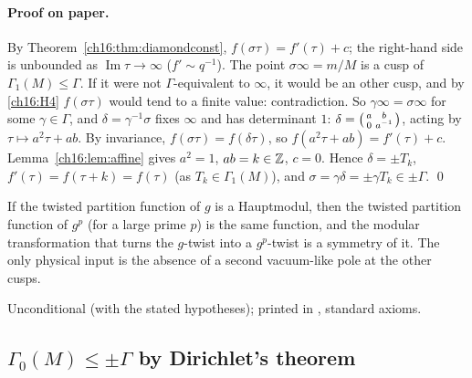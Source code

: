 \paragraph{Proof on paper.}  By Theorem~\ref{ch16:thm:diamondconst}, $f(\sigma\tau)=f'(\tau)+c$; the right-hand side is
unbounded as $\operatorname{Im}\tau\to\infty$ ($f'\sim q^{-1}$).  The point $\sigma\infty=m/M$ is a cusp of
$\Gamma_1(M)\le\Gamma$.  If it were not $\Gamma$-equivalent to $\infty$, it would be an other cusp, and by \ref{ch16:H4}
$f(\sigma\tau)$ would tend to a finite value: contradiction.  So $\gamma\infty=\sigma\infty$ for some $\gamma\in\Gamma$,
and $\delta=\gamma^{-1}\sigma$ fixes $\infty$ and has determinant $1$: $\delta=\left(\begin{smallmatrix}a&b\\0&a^{-1}\end{smallmatrix}\right)$, acting by
$\tau\mapsto a^2\tau+ab$.  By invariance, $f(\sigma\tau)=f(\delta\tau)$, so $f(a^2\tau+ab)=f'(\tau)+c$.
Lemma~\ref{ch16:lem:affine} gives $a^2=1$, $ab=k\in{\mathbb{Z}}$, $c=0$.  Hence $\delta=\pm T_k$, $f'(\tau)=f(\tau+k)=f(\tau)$ (as
$T_k\in\Gamma_1(M)$), and $\sigma=\gamma\delta=\pm\gamma T_k\in\pm\Gamma$. \qed
\begin{physics}
If the twisted partition function of $g$ is a Hauptmodul, then the twisted partition function of $g^p$ (for a large
prime $p$) is the same function, and the modular transformation that turns the $g$-twist into a $g^p$-twist is a
symmetry of it.  The only physical input is the absence of a second vacuum-like pole at the other cusps.
\end{physics}
\begin{status}
Unconditional (with the stated hypotheses); printed in ,
standard axioms.
\end{status}

\subsection{\texorpdfstring{$\Gamma_0(M)\le\pm\Gamma$}{Gamma0(M) in ±Gamma} by Dirichlet's theorem}


